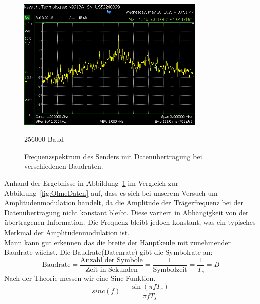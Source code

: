 \begin{figure}[H]
        \vspace{0.5cm}
        \begin{minipage}{0.1\textwidth}
        \end{minipage}
        \hfill
        \begin{minipage}{0.47\textwidth}
            \centering
            \includegraphics[width=0.8\textwidth]{Pictures/4.4C.256000.png}
            \caption*{256000 Baud}
        \end{minipage}
        \hfill
        \begin{minipage}{0.1\textwidth}
        \end{minipage}

        \caption{Frequenzspektrum des Senders mit Datenübertragung bei verschiedenen Baudraten.}
        \label{fig:MitDaten}
    \end{figure}

Anhand der Ergebnisse in Abbildung~\ref{fig:MitDaten} im Vergleich zur Abbildung~\ref{fig:OhneDaten} auf, dass es sich bei unserem Versuch um Amplitudenmodulation handelt, da die Amplitude der Trägerfrequenz bei der Datenübertragung nicht konstant bleibt. Diese variiert in Abhängigkeit von der übertragenen Information. Die Frequenz bleibt jedoch konstant, was ein typisches Merkmal der Amplitudenmodulation ist.
\\
Mann kann gut erkennen das die breite der Hauptkeule mit zunehmender Baudrate wächst.
Die Baudrate(Datenrate) gibt die Symbolrate an:
\begin{equation}
    \text{Baudrate} = \frac{\text{Anzahl der Symbole}}{\text{Zeit in Sekunden}}= \frac{1}{\text{Symbolzeit}}= \frac{1}{T_s} = B
\end{equation}
Nach der Theorie messen wir eine Sinc Funktion.
\begin{equation}
    sinc(f) = \frac{\sin(\pi f T_s)}{\pi f T_s}
\end{equation}

